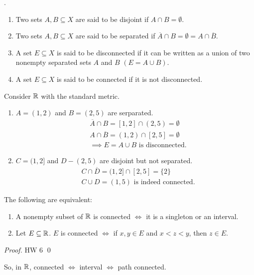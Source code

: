 \graphicspath{{./images/}}
\begin{definition}
    \routineMS.
    \begin{enumerate}[$(i)$]
        \item Two sets $A,B \subseteq X$ are said to be disjoint if $A\cap B = \emptyset$.
        \item Two sets $A,B \subseteq X$ are said to be separated if $\overline{A}\cap B = \emptyset = A \cap \overline{B}$.
        \item A set $E\subseteq X$ is said to be disconnected if it can be written as a union of two nonempty separated sets $A$ and $B$ $(E=A\cup B)$.
        \item A set $E\subseteq X$ is said to be connected if it is not disconnected.
    \end{enumerate}
\end{definition}

\begin{example}
    Consider $\mathbb{R}$ with the standard metric.
    \begin{enumerate}[$*)$]
        \item $A=(1,2)$ and $B=(2,5)$ are serparated.
        \begin{align*}
            &\overline{A}\cap B = [1,2] \cap (2,5) = \emptyset \\
            &A\cap \overline{B} = (1,2) \cap [2,5] = \emptyset \\
            &\implies E=A\cup B \text{ is disconnected.}
        \end{align*}

        \item $C = (1,2]$ and $D-(2,5)$ are disjoint but not separated.
        \begin{align*}
            &C \cap \overline{D} = (1,2] \cap [2,5] = \{2\} \\
            &C \cup D = (1,5) \text{ is indeed connected.}
        \end{align*}
    \end{enumerate}
\end{example}

\begin{theorem}
    \label{thm2.47}
    The following are equivalent:
    \begin{enumerate}[$(i)$]
        \item A nonempty subset of $\mathbb{R}$ is connected $\iff$ it is a singleton or an interval.
        \item Let $E\subseteq \mathbb{R}$. $E$ is connected $\iff$ if $x,y\in E$ and $x < z < y$, then $z\in E$.
    \end{enumerate}
\end{theorem}
\begin{proof}
    HW 6 \qed
\end{proof}
So, in $\mathbb{R}$, connected $\iff$ interval $\iff$ path connected.


